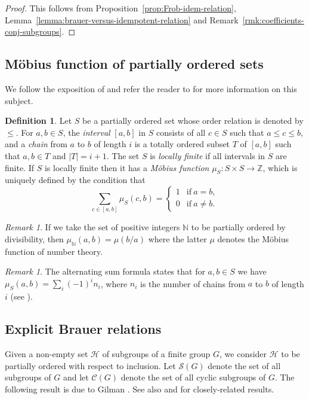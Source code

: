 \documentclass[12pt]{amsart}
\theoremstyle{plain}
\theoremstyle{remark}
\newtheorem{remark}[theorem]{Remark}
\theoremstyle{definition}
\newtheorem{definition}[theorem]{Definition}
\newcommand{\Z}{\mathbb{Z}}
\newcommand{\N}{\mathbb{N}}
\numberwithin{equation}{section}
\begin{document}
\begin{proof}
This follows from Proposition~\ref{prop:Frob-idem-relation}, Lemma~\ref{lemma:brauer-versus-idempotent-relation} and Remark~\ref{rmk:coefficients-conj-subgroups}.
\end{proof}

\subsection{M\"obius function of partially ordered sets}
We follow the exposition of \cite[\S 2]{MR602896} and
refer the reader to \cite{MR2483561} for more information on this subject.

\begin{definition}\label{def:mobius}
Let $S$ be a partially ordered set whose order relation is denoted by $\leq$.
For $a,b \in S$, the \emph{interval} $[a,b]$ in $S$
consists of all $c \in S$ such that $a \leq c \leq b$,
and a \emph{chain} from $a$ to $b$ of length $i$ is 
a totally ordered subset $T$ of $[a,b]$ such that $a,b \in T$ and $|T|=i+1$.
The set $S$ is \emph{locally finite} if all intervals in $S$ are finite.
If $S$ is locally finite then it has a \emph{M\"obius function} $\mu_{S} : S \times S \rightarrow \Z$,
which is uniquely defined by the condition that
\begin{equation}\label{eq:mobius}
\sum_{c \in [a,b]} \mu_{S}(c,b) 
=
\begin{cases}
      1 & \text{if}\ a=b, \\
      0 & \text{if}\ a \neq b.
\end{cases}  
\end{equation}
\end{definition}

\begin{remark}\label{rmk:nt-mobius}
If we take the set of positive integers $\N$ to be partially ordered by divisibility, 
then $\mu_{\N}(a,b)=\mu(b/a)$ where the latter $\mu$ denotes the M\"obius
function of number theory. 
\end{remark}

\begin{remark}\label{rmk:alt-sum-formula}
The alternating sum formula states that for $a,b \in S$ we have 
$\mu_{S}(a,b)=\sum_{i}(-1)^{i}n_{i}$, where $n_{i}$ is the number of chains from $a$ to $b$ of length $i$
(see \cite[3.1.11]{MR2483561}).
\end{remark}

\subsection{Explicit Brauer relations}\label{subsec:explicit-Brauer}
Given a non-empty set $\mathcal{H}$ of subgroups of a finite group $G$, we consider
$\mathcal{H}$ to be partially ordered with respect to inclusion.
Let $\mathcal{S}(G)$ denote the set of all subgroups of $G$ and let
$\mathcal{C}(G)$ denote the set of all cyclic subgroups of $G$. 
The following result is due to Gilman \cite[Lemma 1]{MR332947}.
See also \cite[\S 3]{MR602896} and \cite[Theorem 3.3]{MR2032439}
for closely-related results.
\end{document}
